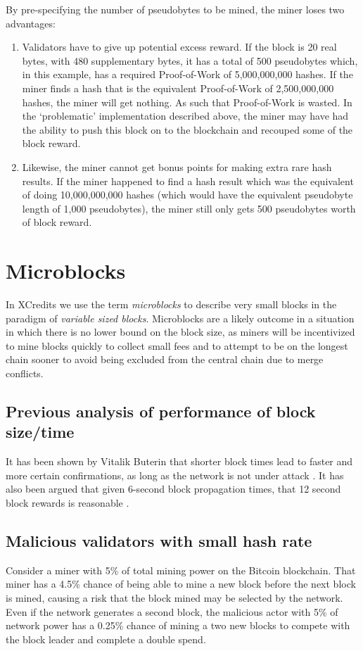 \documentclass[a4paper,12pt]{article}
\begin{document}
By pre-specifying the number of pseudobytes to be mined, the miner loses two advantages:
\begin{enumerate}
  \item Validators have to give up potential excess reward. If the block is 20 real bytes, with 480 supplementary bytes, it has a total of 500 pseudobytes which, in this example, has a required Proof-of-Work of 5,000,000,000 hashes. If the miner finds a hash that is the equivalent Proof-of-Work of 2,500,000,000 hashes, the miner will get nothing. As such that Proof-of-Work is wasted. In the `problematic' implementation described above, the miner may have had the ability to push this block on to the blockchain and recouped some of the block reward. 
  \item Likewise, the miner cannot get bonus points for making extra rare hash results. If the miner happened to find a hash result which was the equivalent of doing 10,000,000,000 hashes (which would have the equivalent pseudobyte length of 1,000 pseudobytes), the miner still only gets 500 pseudobytes worth of block reward.
\end{enumerate}


\section{Microblocks}
In XCredits we use the term \textit{\gls{microblocks}} to describe very small blocks in the paradigm of \textit{variable sized blocks}. Microblocks are a likely outcome in a situation in which there is no lower bound on the block size, as miners will be incentivized to mine blocks quickly to collect small fees and to attempt to be on the longest chain sooner to avoid being excluded from the central chain due to merge conflicts. 

\subsection{Previous analysis of performance of block size/time}\label{block-time-performance}

It has been shown by Vitalik Buterin that shorter block times lead to faster and more certain confirmations, as long as the network is not under attack \cite{onSlowAndFastBlockTimes}. It has also been argued that given 6-second block propagation times, that 12 second block rewards is reasonable \cite{towardA12SecondBlockTime}. 

\subsection{Malicious validators with small hash rate}
Consider a miner with 5\% of total mining power on the Bitcoin blockchain. That miner has a 4.5\% chance of being able to mine a new block before the next block is mined, causing a risk that the block mined may be selected by the network. Even if the network generates a second block, the malicious actor with 5\% of network power has a 0.25\% chance of mining a two new blocks to compete with the block leader and complete a double spend. 
\end{document}
